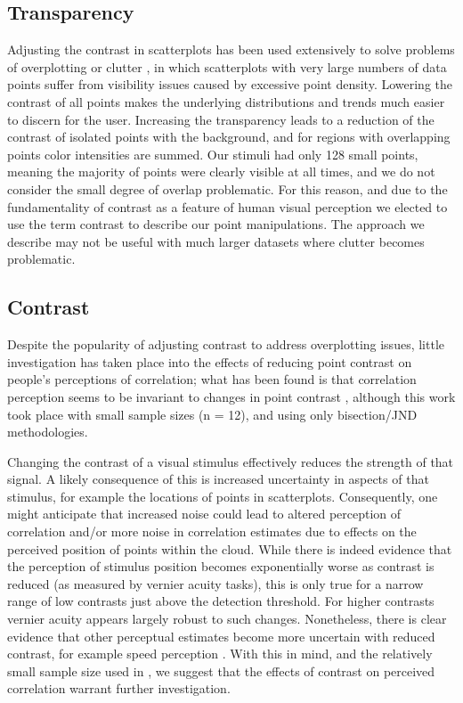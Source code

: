 \documentclass[preprint, 3p,
authoryear]{elsarticle} %
\begin{document}
\hypertarget{transparency}{%
\subsection{Transparency}\label{transparency}}

Adjusting the contrast in scatterplots has been used extensively to
solve problems of overplotting or clutter
\citep{matejka_2015, bertini_2004}, in which scatterplots with very
large numbers of data points suffer from visibility issues caused by
excessive point density. Lowering the contrast of all points makes the
underlying distributions and trends much easier to discern for the user.
Increasing the transparency leads to a reduction of the contrast of
isolated points with the background, and for regions with overlapping
points color intensities are summed. Our stimuli had only 128 small
points, meaning the majority of points were clearly visible at all
times, and we do not consider the small degree of overlap problematic.
For this reason, and due to the fundamentality of contrast as a feature
of human visual perception \citep{ginsburg_2003} we elected to use the
term contrast to describe our point manipulations. The approach we
describe may not be useful with much larger datasets where clutter
becomes problematic.

\hypertarget{contrast}{%
\subsection{Contrast}\label{contrast}}

Despite the popularity of adjusting contrast to address overplotting
issues, little investigation has taken place into the effects of
reducing point contrast on people's perceptions of correlation; what has
been found is that correlation perception seems to be invariant to
changes in point contrast \citep{rensink_2012}, although this work took
place with small sample sizes (n = 12), and using only bisection/JND
methodologies.

Changing the contrast of a visual stimulus effectively reduces the
strength of that signal. A likely consequence of this is increased
uncertainty in aspects of that stimulus, for example the locations of
points in scatterplots. Consequently, one might anticipate that
increased noise could lead to altered perception of correlation and/or
more noise in correlation estimates due to effects on the perceived
position of points within the cloud. While there is indeed evidence
\citep{wehrhahn_1990} that the perception of stimulus position becomes
exponentially worse as contrast is reduced (as measured by vernier
acuity tasks), this is only true for a narrow range of low contrasts
just above the detection threshold. For higher contrasts vernier acuity
appears largely robust to such changes. Nonetheless, there is clear
evidence that other perceptual estimates become more uncertain with
reduced contrast, for example speed perception \citep{champion_2017}.
With this in mind, and the relatively small sample size used in
\citet{rensink_2012}, we suggest that the effects of contrast on
perceived correlation warrant further investigation.
\end{document}
